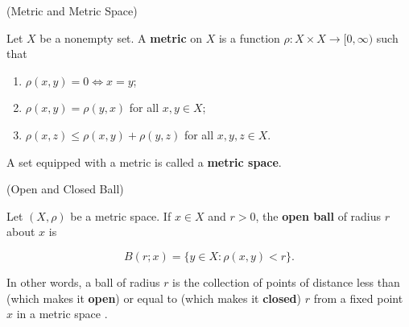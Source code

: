 \begin{definition}{(Metric and Metric Space) \cite{folland2013real}}

Let $X$ be a nonempty set. A \textbf{metric} on $X$ is a function $\rho : X \times X \rightarrow [0,\infty)$ such that
    
\begin{enumerate}[label=(\roman*)]
    \item $\rho(x,y) = 0 \Leftrightarrow x = y$;
    
    \item $\rho(x,y) = \rho(y,x)$ for all $x,y \in X$;
    
    \item $\rho(x,z) \leq \rho(x,y) + \rho(y,z)$ for all $x,y,z \in X$.
    
\end{enumerate}

\vspace{0.05in}

A set equipped with a metric is called a \textbf{metric space}.

\end{definition}
\vspace{0.1in}

\begin{definition}{(Open and Closed Ball) \cite{folland2013real}}

Let $(X, \rho)$ be a metric space. If $x \in X$ and $r > 0$, the \textbf{open ball} of radius $r$ about $x$ is

\[B(r;x) = \{y \in X : \rho(x,y) < r \}.\]

\noindent In other words, a ball of radius $r$ is the collection of points of distance less than (which makes it \textbf{open}) or equal to (which makes it \textbf{closed}) $r$ from a fixed point $x$ in a metric space \cite{croft2012unsolved}.

\end{definition}
\vspace{0.1in}

